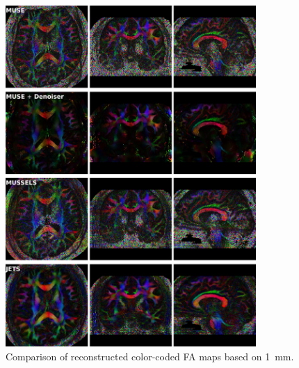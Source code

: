 \documentclass[preprint,12pt,authoryear,review]{elsarticle}
\begin{document}
	\begin{figure}[h!]
		\centering
		\includegraphics[width=0.85\textwidth]{../figures/supp_fig6.png}
		\caption{Comparison of reconstructed color-coded FA maps
		based on \SI{1}{mm}.}
		\label{FIG:1.0mm_cFA}
	\end{figure}
\end{document}
